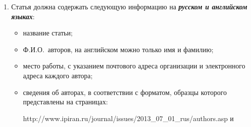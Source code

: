 {\begin{enumerate}[1.]
\pagebreak

\def\leftkol{Правила подготовки рукописей  для публикации в журнале
<<Информатика и её применения>>}

\def\rightkol{Правила подготовки рукописей  для публикации в журнале
<<Информатика и её применения>>}



Рекомендуемый объем рукописи~--- не свыше 10~страниц указанного формата.
При превышении указанного объема редколлегия вправе потребовать от 
автора сокращения объема рукописи.


Сокращения слов, помимо стандартных, не допускаются. Допускается минимальное
количество аббревиатур.


Все страницы рукописи нумеруются.

Шаблоны примеров оформления представлены в Интернете: {\sf
http://www.ipiran.ru/journal/\linebreak template.doc}\\[-14pt]

\item Статья должна содержать следующую информацию на {\bfseries\textit{русском и
английском языках}}:\\[-14pt]

\begin{itemize}
\item название статьи;\\[-14.3pt]
\item Ф.И.О.\ авторов, на английском можно только имя и фамилию;\\[-14.3pt]
\item место работы, с указанием почтового адреса организации и электронного адреса каждого
автора;\\[-14.3pt]
\item сведения об авторах, в соответствии с форматом, образцы которого
представлены на страницах:



\def\leftfootline{\small{\textbf{\thepage}
\hfill ИНФОРМАТИКА И ЕЁ ПРИМЕНЕНИЯ\ \ \ том\ 14\ \ \ выпуск\ 3\ \ \ 2020}
}%
 \def\rightfootline{\small{ИНФОРМАТИКА И ЕЁ ПРИМЕНЕНИЯ\ \ \ том\ 14\ \ \ выпуск\ 3\ \ \ 2020
\hfill \textbf{\thepage}}}



{\sf http://www.ipiran.ru/journal/issues/2013\_07\_01\_rus/authors.asp} и


\end{itemize}
\end{enumerate}}
